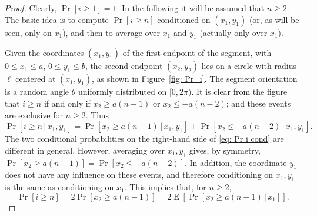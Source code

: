 \documentclass[12pt, a4paper]{article}
\newcommand{\cond}{\,|\,} %
\DeclareMathOperator{\E}{E}
\newcommand{\len}{\ell} %
\newcommand{\orient}{\theta}
\begin{document}
\begin{proof}
Clearly, $\Pr[i \geq 1]=1$. In the following it will be assumed that $n \geq 2$. The basic idea is to compute $\Pr[i \geq n]$ conditioned on $(x_1,y_1)$ (or, as will be seen, only on $x_1$), and then to average over $x_1$ and $y_1$ (actually only over $x_1$).

Given the coordinates $(x_1, y_1)$ of the first endpoint of the segment, with $0 \leq x_1 \leq a$, $0 \leq y_1 \leq b$, the second endpoint $(x_2, y_2)$ lies on a circle with radius $\len$ centered at $(x_1,y_1)$, as shown in Figure~\ref{fig: Pr_i}. The segment orientation is a random angle $\orient$ uniformly distributed on $[0,2\pi)$. It is clear from the figure that $i \geq n$ if and only if $x_2 \geq a(n-1)$ or $x_2 \leq -a(n-2)$; and these events are exclusive for $n \geq 2$. Thus
\begin{equation}
\label{eq: Pr i cond}
\Pr[i \geq n \cond x_1, y_1] = \Pr[x_2 \geq a(n-1) \cond x_1, y_1] + \Pr[x_2 \leq -a(n-2) \cond x_1, y_1].
\end{equation}
The two conditional probabilities on the right-hand side of \eqref{eq: Pr i cond} are different in general. However, averaging over $x_1, y_1$ gives, by symmetry, $\Pr[x_2 \geq a(n-1)] = \Pr[x_2 \leq -a(n-2)]$. In addition, the coordinate $y_1$ does not have any influence on these events, and therefore conditioning on $x_1, y_1$ is the same as conditioning on $x_1$. This implies that, for $n \geq 2$,
\begin{equation}
\label{eq: Pr i = 2 Pr}
\Pr[i \geq n] = 2 \Pr[x_2 \geq a(n-1)] = 2 \E[\Pr[x_2 \geq a(n-1) \cond x_1]].
\end{equation}


\end{proof}
\end{document}
